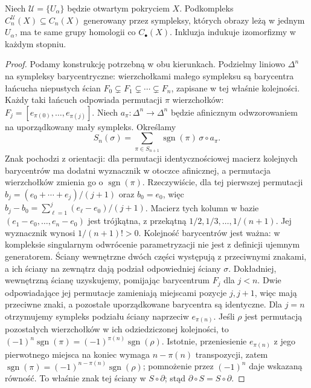 \begin{lemat}
\label{lem:male-lancuchy}
Niech $\mathcal U=\{U_\alpha\}$ będzie otwartym
pokryciem $X$. Podkompleks
$C_n^{\mathcal U}(X)\subseteq C_n(X)$
generowany przez sympleksy, których obrazy
leżą w jednym $U_\alpha$, ma te same
grupy homologii co $C_\bullet(X)$.
Inkluzja indukuje izomorfizmy w każdym stopniu.
\end{lemat}
\begin{proof}
Podamy konstrukcję potrzebną w obu kierunkach.
Podzielmy liniowo $\Delta^n$ na sympleksy
barycentryczne: wierzchołkami małego sympleksu
są barycentra łańcucha niepustych ścian
$F_0\subsetneq F_1\subsetneq\cdots\subsetneq F_n$,
zapisane w tej właśnie kolejności. Każdy taki łańcuch odpowiada
permutacji $\pi$ wierzchołków: $F_j=[e_{\pi(0)},\ldots,e_{\pi(j)}]$.
Niech $a_\pi:\Delta^n\to\Delta^n$ będzie afinicznym odwzorowaniem
na uporządkowany mały sympleks. Określamy
\[
 S_n(\sigma)=\sum_{\pi\in S_{n+1}}\operatorname{sgn}(\pi)
                 \,\sigma\circ a_\pi.
\]
Znak pochodzi z orientacji: dla permutacji identycznościowej
macierz kolejnych barycentrów ma dodatni wyznacznik w otoczce afinicznej,
a permutacja wierzchołków zmienia go o $\operatorname{sgn}(\pi)$.
Rzeczywiście, dla tej pierwszej permutacji
$b_j=(e_0+\cdots+e_j)/(j+1)$ oraz $b_0=e_0$, więc
$b_j-b_0=\sum_{\ell=1}^j(e_\ell-e_0)/(j+1)$.
Macierz tych kolumn w bazie $(e_1-e_0,\ldots,e_n-e_0)$
jest trójkątna, z przekątną $1/2,1/3,\ldots,1/(n+1)$.
Jej wyznacznik wynosi $1/(n+1)!>0$.
Kolejność barycentrów jest ważna: w kompleksie singularnym
odwrócenie parametryzacji nie jest z definicji ujemnym generatorem.
Ściany wewnętrzne dwóch części
występują z przeciwnymi znakami,
a ich ściany na zewnątrz dają
podział odpowiedniej ściany $\sigma$.
Dokładniej, wewnętrzną ścianę uzyskujemy, pomijając barycentrum $F_j$
dla $j<n$. Dwie odpowiadające jej permutacje zamieniają miejscami
pozycje $j,j+1$, więc mają przeciwne znaki, a pozostałe
uporządkowane barycentra są identyczne. Dla $j=n$ otrzymujemy
sympleks podziału ściany naprzeciw $e_{\pi(n)}$.
Jeśli $\rho$ jest permutacją pozostałych wierzchołków w ich
odziedziczonej kolejności, to
$(-1)^n\operatorname{sgn}(\pi)=(-1)^{\pi(n)}\operatorname{sgn}(\rho)$.
Istotnie, przeniesienie $e_{\pi(n)}$ z jego pierwotnego miejsca
na koniec wymaga $n-\pi(n)$ transpozycji, zatem
$\operatorname{sgn}(\pi)=(-1)^{n-\pi(n)}\operatorname{sgn}(\rho)$;
pomnożenie przez $(-1)^n$ daje wskazaną równość.
To właśnie znak tej ściany w $S\circ\partial$;
stąd $\partial\circ S=S\circ\partial$.


\end{proof}
